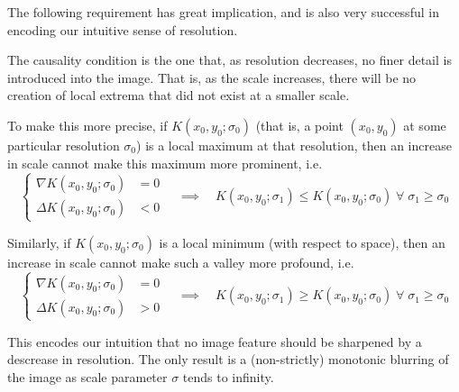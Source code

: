 	 
	
    
  
   
	The following requirement has great implication, and is also
	very successful in encoding our intuitive sense
	of resolution.
   \begin{axiom} \label{axiom:causality}
    The causality condition is the one
    that, as resolution decreases, no finer detail is
    introduced into the image. That is, as the scale
    increases, there will be no creation of local extrema
    that did not exist at a smaller scale.
    \end{axiom}
    To make this more precise, if $K(x_0,y_0 ; \sigma_0)$ (that is, a point $(x_0,y_0)$ at some particular
    resolution $\sigma_0$) is a local maximum at that resolution,
    then an increase in scale cannot make this maximum more prominent, i.e.
    \begin{equation}
    \left\{\begin{aligned}
    \nabla K(x_0,y_0; \sigma_0) &= 0 \\
    \Delta K(x_0,y_0;\sigma_0) &< 0
    \end{aligned}\right.
	\quad \implies \quad
	K(x_0,y_0;\sigma_1) \le K(x_0,y_0;\sigma_0)
	\; \forall\; \sigma_1 \ge \sigma_0
    \end{equation}
    
    Similarly, if $K(x_0,y_0;\sigma_0)$ is a local minimum (with respect to space), then an increase in scale cannot make such a valley more profound, i.e.
   \begin{equation}
   \left\{\begin{aligned}
   \nabla K(x_0,y_0; \sigma_0) &= 0 \\
	\Delta K(x_0,y_0;\sigma_0) &> 0
	\end{aligned}\right.
	\quad \implies \quad
	K(x_0,y_0;\sigma_1) \ge K(x_0,y_0;\sigma_0)
	\; \forall\; \sigma_1 \ge \sigma_0
	\end{equation}
    
    This encodes our intuition that no image feature should be sharpened by a descrease in resolution. The only result is a (non-strictly) monotonic blurring of the image as scale parameter $\sigma$ tends to infinity.

